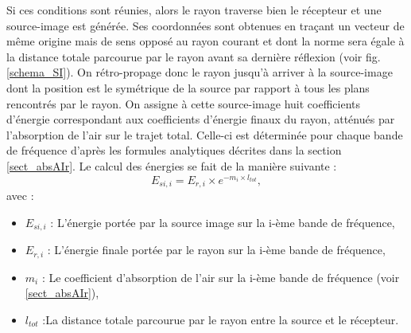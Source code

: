 %
Si ces conditions sont réunies, alors le rayon traverse bien le récepteur et une source-image est générée. Ses coordonnées sont obtenues en traçant un vecteur de même origine mais de sens opposé au rayon courant et dont la norme sera égale à la distance totale parcourue par le rayon avant sa dernière réflexion (voir fig. \ref{schema_SI}). On rétro-propage donc le rayon jusqu'à arriver à la source-image dont la position est le symétrique de la source par rapport à tous les plans rencontrés par le rayon. On assigne à cette source-image huit coefficients d'énergie correspondant aux coefficients d'énergie finaux du rayon, atténués par l'absorption de l'air sur le trajet total. Celle-ci est déterminée pour chaque bande de fréquence d'après les formules analytiques décrites dans la section \ref{sect_absAIr}. Le calcul des énergies se fait de la manière suivante :
%
\begin{equation}
E_{si, i} = E_{r, i} \times e^{-m_i \times l_{tot}},
\end{equation}
avec : 
\begin{itemize}
\item $E_{si, i}$ : L'énergie portée par la source image sur la i-ème bande de fréquence,
\item $E_{r, i}$ : L'énergie finale portée par le rayon sur la i-ème bande de fréquence,
\item $m_i$ : Le coefficient d'absorption de l'air sur la i-ème bande de fréquence (voir \ref{sect_absAIr}),
\item $ l_{tot}$ :La distance totale parcourue par le rayon entre la source et le récepteur.
\end{itemize}

